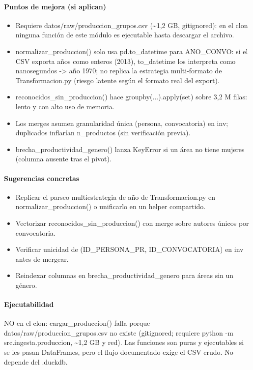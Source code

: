 \paragraph{Puntos de mejora (si aplican)}
\begin{itemize}
  \item Requiere datos/raw/produccion\_grupos.csv (\textasciitilde{}1,2 GB, gitignored): en el clon ninguna función de este módulo es ejecutable hasta descargar el archivo.
  \item normalizar\_produccion() solo usa pd.to\_datetime para ANO\_CONVO: si el CSV exporta años como enteros (2013), to\_datetime los interpreta como nanosegundos -> año 1970; no replica la estrategia multi-formato de Transformacion.py (riesgo latente según el formato real del export).
  \item reconocidos\_sin\_produccion() hace groupby(...).apply(set) sobre 3,2 M filas: lento y con alto uso de memoria.
  \item Los merges asumen granularidad única (persona, convocatoria) en inv; duplicados inflarían n\_productos (sin verificación previa).
  \item brecha\_productividad\_genero() lanza KeyError si un área no tiene mujeres (columna ausente tras el pivot).
\end{itemize}

\paragraph{Sugerencias concretas}
\begin{itemize}
  \item Replicar el parseo multiestrategia de año de Transformacion.py en normalizar\_produccion() o unificarlo en un helper compartido.
  \item Vectorizar reconocidos\_sin\_produccion() con merge sobre autores únicos por convocatoria.
  \item Verificar unicidad de (ID\_PERSONA\_PR, ID\_CONVOCATORIA) en inv antes de mergear.
  \item Reindexar columnas en brecha\_productividad\_genero para áreas sin un género.
\end{itemize}

\paragraph{Ejecutabilidad}
NO en el clon: cargar\_produccion() falla porque datos/raw/produccion\_grupos.csv no existe (gitignored; requiere python -m src.ingesta.produccion, \textasciitilde{}1,2 GB y red). Las funciones son puras y ejecutables si se les pasan DataFrames, pero el flujo documentado exige el CSV crudo. No depende del .duckdb.

